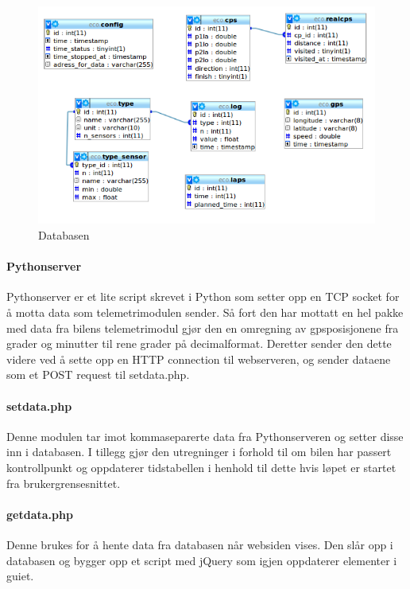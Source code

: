 \begin{figure}[H]
\includegraphics[width=\textwidth]{images/er.png}
\caption{Databasen}
\label{fig:er}
\end{figure}

\paragraph{Pythonserver}
Pythonserver er et lite script skrevet i Python som setter opp en TCP socket for å motta data som telemetrimodulen sender. Så fort den har mottatt en hel pakke med data fra bilens telemetrimodul gjør den en omregning av gpsposisjonene fra grader og minutter til rene grader på decimalformat. Deretter sender den dette videre ved å sette opp en HTTP connection til webserveren, og sender dataene som et POST request til setdata.php.
\paragraph{setdata.php}
Denne modulen tar imot kommaseparerte data fra Pythonserveren og setter disse inn i databasen. I tillegg gjør den utregninger i forhold til om bilen har passert kontrollpunkt og oppdaterer tidstabellen i henhold til dette hvis løpet er startet fra brukergrensesnittet.
\paragraph{getdata.php}
Denne brukes for å hente data fra databasen når websiden vises. Den slår opp i databasen og bygger opp et script med jQuery\cite{jquery} som igjen oppdaterer elementer i guiet.
